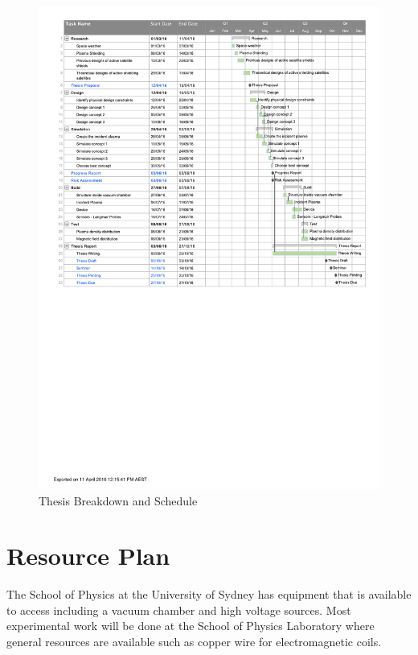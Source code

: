 \documentclass[12pt,a4paper]{article}
\begin{document}
\begin{figure}[h]
\centering
\caption{Thesis Breakdown and Schedule}
\label{fig:ProposalGantt}
\includegraphics[trim = 1cm 12.2cm 0 8mm, clip,width=1\linewidth]{ProposalGantt.pdf}
\end{figure}



\section*{Resource Plan}

The School of Physics at the University of Sydney has equipment that is available to access including a vacuum chamber and high voltage sources. Most experimental work will be done at the School of Physics Laboratory where general resources are available such as copper wire for electromagnetic coils. 
\end{document}
